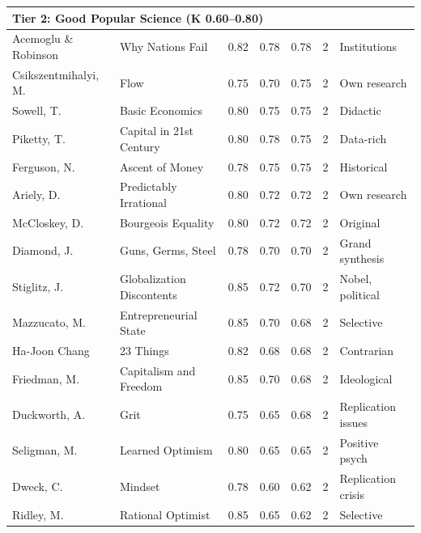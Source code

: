 \documentclass[11pt,a4paper]{article}
\begin{document}
\begin{longtable}{p{3.5cm}p{4cm}ccccp{2cm}}
\midrule
\multicolumn{7}{l}{\textbf{Tier 2: Good Popular Science (K 0.60--0.80)}} \\
\midrule
Acemoglu \& Robinson & Why Nations Fail & 0.82 & 0.78 & 0.78 & 2 & Institutions \\
Csikszentmihalyi, M. & Flow & 0.75 & 0.70 & 0.75 & 2 & Own research \\
Sowell, T. & Basic Economics & 0.80 & 0.75 & 0.75 & 2 & Didactic \\
Piketty, T. & Capital in 21st Century & 0.80 & 0.78 & 0.75 & 2 & Data-rich \\
Ferguson, N. & Ascent of Money & 0.78 & 0.75 & 0.75 & 2 & Historical \\
Ariely, D. & Predictably Irrational & 0.80 & 0.72 & 0.72 & 2 & Own research \\
McCloskey, D. & Bourgeois Equality & 0.80 & 0.72 & 0.72 & 2 & Original \\
Diamond, J. & Guns, Germs, Steel & 0.78 & 0.70 & 0.70 & 2 & Grand synthesis \\
Stiglitz, J. & Globalization Discontents & 0.85 & 0.72 & 0.70 & 2 & Nobel, political \\
Mazzucato, M. & Entrepreneurial State & 0.85 & 0.70 & 0.68 & 2 & Selective \\
Ha-Joon Chang & 23 Things & 0.82 & 0.68 & 0.68 & 2 & Contrarian \\
Friedman, M. & Capitalism and Freedom & 0.85 & 0.70 & 0.68 & 2 & Ideological \\
Duckworth, A. & Grit & 0.75 & 0.65 & 0.68 & 2 & Replication issues \\
Seligman, M. & Learned Optimism & 0.80 & 0.65 & 0.65 & 2 & Positive psych \\
Dweck, C. & Mindset & 0.78 & 0.60 & 0.62 & 2 & Replication crisis \\
Ridley, M. & Rational Optimist & 0.85 & 0.65 & 0.62 & 2 & Selective \\


\end{longtable}
\end{document}

